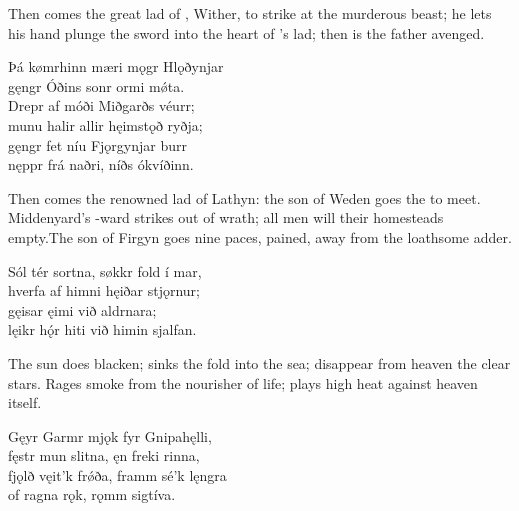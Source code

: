 \bvb Then comes the great lad of , Wither, to strike at the murderous beast; he lets his hand plunge the sword into the heart of ’s lad\footnotemark[1]; then is the father avenged.\evb
{}

\bva Þá kømr\footnotemark[1] hinn mæri \hld mǫgr Hlǫðynjar \\%
gęngr Óðins sonr \hld ormi mǿta. \\%
Drepr af móði \hld Miðgarðs véurr; \\%
munu halir allir \hld hęimstǫð ryðja; \\%
gęngr fet níu \hld Fjǫrgynjar burr \\%
nęppr frá naðri, \hld níðs ókvíðinn.\footnotemark[2]\eva
{}

\bvb Then comes the renowned lad of Lathyn: the son of Weden goes the  to meet. Middenyard’s -ward strikes out of wrath; all men will their homesteads empty.\footnotemark[1] The son of Firgyn goes nine paces, pained, away from the loathsome adder.\footnotemark[2]\evb
{}

\bva Sól tér sortna, \hld søkkr fold í mar, \\%
hverfa af himni \hld hęiðar stjǫrnur; \\%
gęisar ęimi \hld við aldrnara; \\%
lęikr hǫ́r hiti \hld við himin sjalfan.\eva

\bvb The sun does blacken; sinks the fold into the sea; disappear from heaven the clear stars. Rages smoke from the nourisher of life\footnotemark[1]; plays high heat against heaven itself.\evb
{}

\bva Gęyr Garmr mjǫk \hld fyr Gnipahęlli, \\%
fęstr mun slitna, \hld ęn freki rinna, \\%
fjǫlð vęit’k frǿða, \hld framm sé’k lęngra \\%
of ragna rǫk, \hld rǫmm sigtíva.\eva

